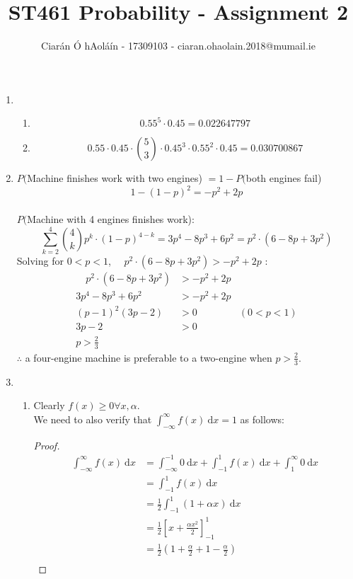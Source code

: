 \documentclass{article}
\title{ST461 Probability - Assignment 2}
\author{Ciarán Ó hAoláín - 17309103 - ciaran.ohaolain.2018@mumail.ie}
\makeatletter
\theoremstyle{definition}
\theoremstyle{remark}
\theoremstyle{example}
\renewcommand{\d}{\ \mathrm{d}}
\newcommand{\skipitems}[1]{%
	\addtocounter{\@enumctr}{#1}%
}
\makeatother
\begin{document}
	\maketitle
	\begin{enumerate}
		\skipitems{1}
		\item \begin{enumerate}
		 \item \[ 0.55^5 \cdot 0.45 =  0.022647797 \]
			 \item \[ 0.55 \cdot 0.45 \cdot {5 \choose 3} \cdot 0.45^3 \cdot 0.55^2 \cdot 0.45 = 0.030700867\]	
		\end{enumerate}
		\item $P($Machine finishes work with two engines) $= 1-P($both engines fail) \[1-(1-p)^2=-p^2+2p\]\\
		$P($Machine with 4 engines finishes work): \[ \sum_{k=2}^{4} {4 \choose k} p^k \cdot (1-p)^{4-k} = 3 p^4 - 8 p^3 + 6 p^2 = p^2 \cdot (6 - 8p + 3p^2) \]
		Solving for $0 < p < 1$,  $\quad p^2 \cdot (6 - 8p + 3p^2) > -p^2+2p$ :
		\begin{align*}
			\quad p^2 \cdot (6 - 8p + 3p^2) &> -p^2+2p\\
			3 p^4 - 8 p^3 + 6 p^2 & > -p^2 + 2p\\
			(p-1)^2(3p-2) & > 0 & ( 0 < p < 1)	\\
			3p-2 &> 0\\
			p > \frac{2}{3}
		\end{align*}
		$\therefore$ a four-engine machine is preferable to a two-engine when $p > \frac{2}{3}$.
		\skipitems{1}
		\item \begin{enumerate}
			\item Clearly $f(x)\geq0 \forall x, \alpha$.\\
			We need to also verify that $\int_{-\infty}^{\infty}f(x) \d x=1$ as follows:
			\begin{proof}
				\begin{align*}
					\int_{-\infty}^{\infty}f(x) \d x &=\int_{-\infty}^{-1}0 \d x + \int_{-1}^{1}f(x) \d x + \int_{1}^{\infty}0 \d x\\
					& = \int_{-1}^{1}f(x) \d x\\
					& = \frac{1}{2} \int_{-1}^{1} \left(1 + \alpha x\right) \d x\\
					& = \frac{1}{2} \left[ x + \frac{\alpha x^2}{2} \right]^1_{-1}\\
					& = \frac{1}{2} \left( 1 + \frac{\alpha}{2} + 1 - \frac{\alpha}{2} \right)\\

\end{align*}
\end{proof}
\end{enumerate}
\end{enumerate}
\end{document}
